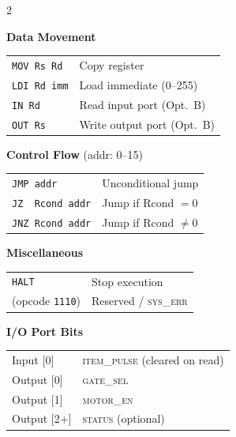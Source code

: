 \documentclass[11pt,a4paper]{article}
\newcommand{\signal}[1]{\textsc{#1}}
\begin{document}
\begin{tcolorbox}[colback=codebg, colframe=ee8blue, title={\large\bfseries EE8 CPU Quick Reference --- Version 4.1}, fonttitle=\color{white}]
\begin{multicols}{2}
\columnbreak

\textbf{Data Movement}\\[2pt]
\begin{tabular}{@{}ll@{}}
\lstinline|MOV Rs Rd|      & Copy register \\
\lstinline|LDI Rd imm|     & Load immediate (0--255) \\
\lstinline|IN Rd|           & Read input port (Opt.\ B) \\
\lstinline|OUT Rs|          & Write output port (Opt.\ B) \\
\end{tabular}

\vspace{6pt}
\textbf{Control Flow} (addr: 0--15)\\[2pt]
\begin{tabular}{@{}ll@{}}
\lstinline|JMP addr|        & Unconditional jump \\
\lstinline|JZ  Rcond addr|  & Jump if Rcond $= 0$ \\
\lstinline|JNZ Rcond addr|  & Jump if Rcond $\neq 0$ \\
\end{tabular}

\vspace{6pt}
\textbf{Miscellaneous}\\[2pt]
\begin{tabular}{@{}ll@{}}
\lstinline|HALT|            & Stop execution \\
(opcode \texttt{1110})      & Reserved / \signal{sys\_err} \\
\end{tabular}

\vspace{6pt}
\textbf{I/O Port Bits}\\[2pt]
\begin{tabular}{@{}ll@{}}
Input [0]  & \signal{item\_pulse} (cleared on read) \\
Output [0] & \signal{gate\_sel} \\
Output [1] & \signal{motor\_en} \\
Output [2+]& \signal{status} (optional) \\
\end{tabular}

\end{multicols}


\end{tcolorbox}
\end{document}
